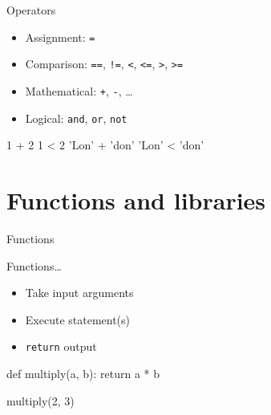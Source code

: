\begin{frame}[fragile]{Operators}
    \begin{itemize}
        \setlength{\itemsep}{0.75em}
        \item Assignment: \texttt{=}
        \item Comparison: \texttt{==}, \texttt{!=},
                          \texttt{<}, \texttt{<=},
                          \texttt{>}, \texttt{>=}
        \item Mathematical: \texttt{+}, \texttt{-},
                            \ldots
        \item Logical: \texttt{and}, \texttt{or},
                       \texttt{not}
    \end{itemize}
    \vfill
    \begin{py3}
        1 + 2
        1 < 2
        'Lon' + 'don'
        'Lon' < 'don'
    \end{py3}
\end{frame}

\section{Functions and libraries}

\begin{frame}[fragile]{Functions}
    \begin{block}{Functions\ldots}
        \begin{itemize}
            \item Take input \alert{arguments}
            \item Execute statement(s)
            \item \texttt{return} output
        \end{itemize}
    \end{block}
    \vfill
    \begin{py3}
        def multiply(a, b):
            return a * b

        multiply(2, 3)
    \end{py3}
\end{frame}

